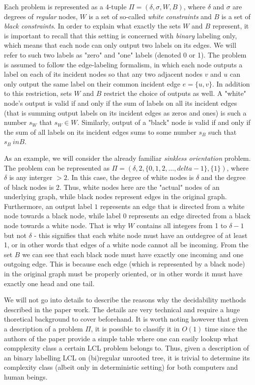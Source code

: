 Each problem is represented as a 4-tuple $\Pi = (\delta, \sigma, W, B)$, where
$\delta$ and $\sigma$ are degrees of \emph{regular} nodes, $W$ is a set of so-called
\emph{white constraints} and $B$ is a set of \emph{black constraints}. In order to
explain what exactly the sets $W$ and $B$ represent, it is important to recall that
this setting is concerned with \emph{binary} labeling only, which means that each node
can only output two labels on its edges. We will refer to such two labels as "zero" and "one"
labels (denoted 0 or 1). The problem is assumed to follow the edge-labeling
formalism, in which each node outputs a label on each of its incident nodes so that
any two adjacent nodes $v$ and $u$ can only output the same label on their common
incident edge $e = \{u, v\}$. In addition to this restriction, sets $W$ and $B$
restrict the choice of outputs as well. A "white" node's output is valid
if and only if the sum of labels on all its incident edges (that is summing
output labels on its incident edges as zeros and ones) is such a number $s_W$ that
$s_W \in W$. Similarly, output of a "black" node is valid if and only if
the sum of all labels on its incident edges sums to some number $s_B$ such that
$s_B \ in B$.

As an example, we will consider the already familiar \emph{sinkless orientation}
problem. The problem can be represented as $\Pi = (\delta, 2, \{0, 1, 2, \dots, delta-1\}, \{ 1 \})$,
where $\delta$ is any interger $> 2$. In this case, the degree of white nodes is
$\delta$ and the degree of black nodes is $2$. Thus, white nodes here are the "actual"
nodes of an underlying graph, while black nodes represent edges in the original graph.
Furthermore, an output label $1$ represents an edge
that is directed from a white node towards a black node, while label $0$ represents
an edge directed from a black node towards a white node. That is why
$W$ contains all integers from 1 to $\delta - 1$ but not $\delta$ - 
this signifies that each white node must have an outdegree of at least 1,
or in other words that edges of a white node cannot all be incoming.
From the set $B$ we can see that each black node must have 
exactly one incoming and one outgoing edge. This is because each edge (which is represented by a black node)
in the original graph must be properly oriented, or in other words it must
have exactly one head and one tail.

We will not go into details to describe the reasons why the decidability methods
described in the paper work. The details are very technical and require a huge
thoretical background to cover beforehand. It is worth noting however that
given a description of a problem $\Pi$, it is possible to classify it in $O(1)$
time since the authors of the paper provide a simple table where one can
easily lookup what compplexity class a certain LCL problem belongs to. Thus,
given a description of an binary labelling LCL on (bi)regular unrooted tree,
it is trivial to determine its complexity class (albeit only in deterministic setting)
for both computers and human beings.

